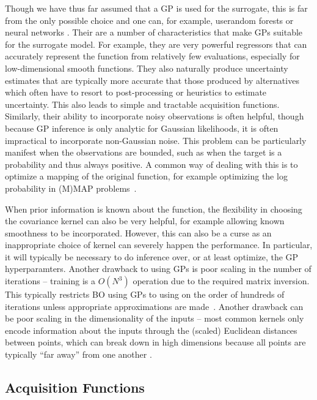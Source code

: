 Though we have thus far assumed that a GP is used for the surrogate, this is far from the only possible choice
and one can, for example, userandom forests \citep{bergstra2011algorithms,hutter2011sequential} 
or neural networks \citep{snoek2015scalable}.  Their are a number
of characteristics that make GPs suitable for the surrogate model.  For example, they are very powerful
regressors that can accurately represent the function from relatively few evaluations, especially
for low-dimensional smooth functions.  They also naturally produce uncertainty estimates
that are typically more accurate that those produced by alternatives which often
have to resort to post-processing or heuristics to estimate uncertainty.
This also leads to simple and tractable acquisition functions.  Similarly, their ability to incorporate
noisy observations is often helpful, though because GP inference is only analytic for Gaussian
likelihoods, it is often impractical to incorporate non-Gaussian noise.  This problem can be
particularly manifest when the observations are bounded, such as when the target is a probability
and thus always positive.  A common way of dealing with this is to optimize a mapping of the
original function, for example optimizing the log probability in (M)MAP problems~\citep{osborne2010bayesian}.

When prior information is known about the function, the
flexibility in choosing the covariance kernel can also be very helpful, for example allowing known
smoothness to be incorporated.  However, this can also be a curse as an inappropriate choice of
kernel can severely happen the performance.  In particular, it will typically be necessary to
do inference over, or at least optimize, the GP hyperparamters.  Another drawback to using GPs
is poor scaling in the number of iterations -- training is a $O(N^3)$ operation due to the required
matrix inversion.  This typically restricts BO using GPs to using on the order of hundreds of iterations
unless appropriate approximations are made~\citep{snelson2006sparse,hensman2013gaussian}.
Another drawback can be poor scaling in the dimensionality of the inputs -- most common kernels
only encode information about the inputs through the (scaled) Euclidean distances between points,
which can break down in high dimensions because all points are typically
``far away'' from one another \citep{bengio2006curse}.  

\subsection{Acquisition Functions}
\label{sec:opt:BO:acq}

